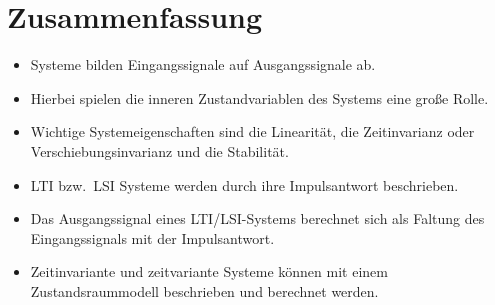 \section*{Zusammenfassung}

\begin{itemize}
  \item Systeme bilden Eingangssignale auf Ausgangssignale ab.
  \item Hierbei spielen die inneren Zustandvariablen des Systems eine große Rolle.
  \item Wichtige Systemeigenschaften sind die Linearität, die Zeitinvarianz oder Verschiebungsinvarianz und die Stabilität.
  \item LTI bzw.\ LSI Systeme werden durch ihre Impulsantwort beschrieben.
  \item Das Ausgangssignal eines LTI/LSI-Systems berechnet sich als Faltung des Eingangssignals mit der Impulsantwort.
  \item Zeitinvariante und zeitvariante Systeme können mit einem Zustandsraummodell beschrieben und berechnet werden.
\end{itemize}
